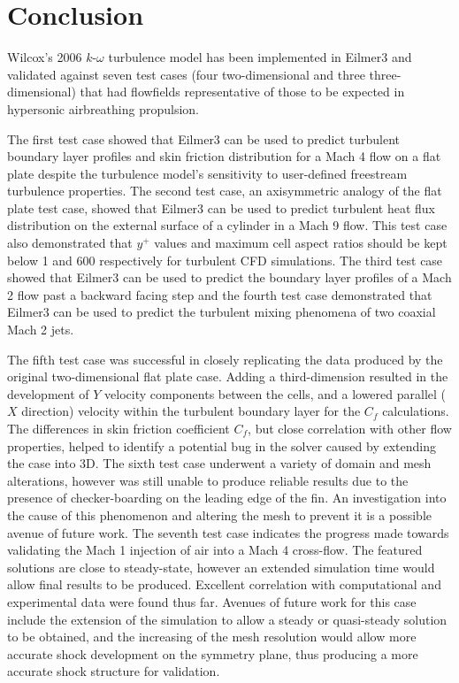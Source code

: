 
\newpage
\section{Conclusion}
\label{chapter-conclusion}
Wilcox's 2006 $k$-$\omega$ turbulence model has been implemented in 
Eilmer3 and validated against seven test cases (four two-dimensional and three three-dimensional) that had flowfields 
representative of those to be expected in hypersonic airbreathing 
propulsion. 

The first test case showed that Eilmer3 can be used to 
predict turbulent boundary layer profiles 
and skin friction distribution for a Mach 4 flow on a flat plate 
despite the turbulence model's sensitivity to user-defined freestream 
turbulence properties. The second test case, an axisymmetric analogy 
of the flat plate test case, showed that Eilmer3 can be used to 
predict turbulent heat flux distribution on the external surface of a cylinder 
in a Mach 9 flow. This test case also demonstrated that $y^+$ values
and maximum cell aspect ratios should be kept below 1 and 600
respectively for turbulent CFD simulations. The third test case showed
that Eilmer3 can be used to predict the boundary layer profiles of
a Mach 2 flow past a backward facing step and the fourth test case
demonstrated that Eilmer3 can be used to predict the turbulent mixing 
phenomena of two coaxial Mach 2 jets. 
%

The fifth test case was successful in closely replicating the data produced by the original two-dimensional flat plate case. Adding a third-dimension resulted in the development of $Y$ velocity components between the cells, and a lowered parallel ($X$ direction) velocity within the turbulent boundary layer for the $C_f$ calculations. The differences in skin friction coefficient $C_f$, but close correlation with other flow properties, helped to identify a potential bug in the solver caused by extending the case into 3D. 
The sixth test case underwent a variety of domain and mesh alterations, however was still unable to produce reliable results due to the presence of checker-boarding on the leading edge of the fin. An investigation into the cause of this phenomenon and altering the mesh to prevent it is a possible avenue of future work.
The seventh test case indicates the progress made towards validating the Mach 1 injection of air into a Mach 4 cross-flow. The featured solutions are close to steady-state, however an extended simulation time would allow final results to be produced. Excellent correlation with computational and experimental data were found thus far. Avenues of future work for this case include the extension of the simulation to allow a steady or quasi-steady solution to be obtained, and the increasing of the mesh resolution would allow more accurate shock development on the symmetry plane, thus producing a more accurate shock structure for validation.